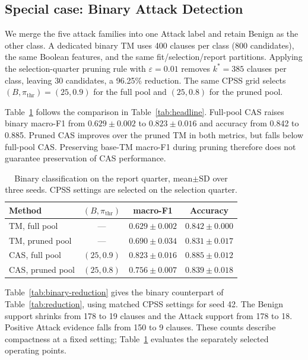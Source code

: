 \subsection{Special case: Binary Attack Detection}
\label{sec:binary}
We merge the five attack families into one Attack label and retain
Benign as the other class. A dedicated binary TM uses 400 clauses
per class (800 candidates), the same Boolean features, and the same
fit/selection/report partitions. Applying the selection-quarter pruning
rule with $\varepsilon=0.01$ removes $k^*=385$ clauses per class,
leaving 30 candidates, a 96.25\% reduction. The same CPSS grid selects
$(B,\pi_{\mathrm{thr}})=(25,0.9)$ for the full pool and $(25,0.8)$
for the pruned pool.

Table~\ref{tab:binary} follows the comparison in
Table~\ref{tab:headline}. Full-pool CAS raises binary macro-F1 from
$0.629\pm0.002$ to $0.823\pm0.016$ and accuracy from 0.842 to
0.885. Pruned CAS improves over the pruned TM in both metrics, but
falls below full-pool CAS. Preserving base-TM macro-F1 during pruning
therefore does not guarantee preservation of CAS performance.

\begin{table}[!htb]
\centering
\caption{Binary classification on the report quarter, mean$\pm$SD
over three seeds. CPSS settings are selected on the selection quarter.}
\label{tab:binary}
\footnotesize
\setlength{\tabcolsep}{3pt}
\begin{tabular}{@{}lccc@{}}
\toprule
Method & $(B,\pi_{\mathrm{thr}})$ & macro-F1 & Accuracy \\
\midrule
TM, full pool & --- & $0.629\pm0.002$ & $0.842\pm0.000$ \\
TM, pruned pool & --- & $0.690\pm0.034$ & $0.831\pm0.017$ \\
CAS, full pool & $(25,0.9)$ & $\mathbf{0.823\pm0.016}$ & $\mathbf{0.885\pm0.012}$ \\
CAS, pruned pool & $(25,0.8)$ & $0.756\pm0.007$ & $0.839\pm0.018$ \\
\bottomrule
\end{tabular}
\end{table}

Table~\ref{tab:binary-reduction} gives the binary counterpart of
Table~\ref{tab:reduction}, using matched CPSS settings for seed 42.
The Benign support shrinks from 178 to 19 clauses and the Attack
support from 178 to 18. Positive Attack evidence falls from 150 to
9 clauses. These counts describe compactness at a fixed setting;
Table~\ref{tab:binary} evaluates the separately selected operating points.

